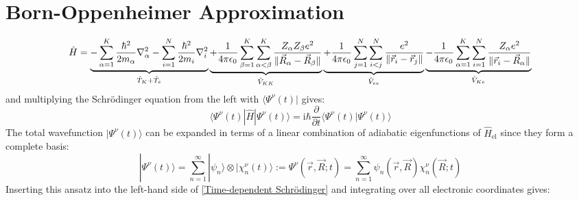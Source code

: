 \documentclass[9pt]{report}
\begin{document}
\section{Born-Oppenheimer Approximation}
\begin{equation}
\hat{H}=\underbrace{-\sum_{\alpha=1}^{K}\frac{\hbar^2}{2m_{\alpha}}\nabla_{\alpha}^2-\sum_{i=1}^{N}\frac{\hbar^2}{2m_{i}}\nabla_{i}^2}_{\hat{T}_K+\hat{T}_e}\underbrace{+\frac{1}{4\pi\epsilon_{0}}\sum_{\beta=1}^{K}\sum_{\alpha<\beta}^{K}\frac{Z_{\alpha}Z_{\beta}e^2}{\Vert\vec{R}_{\alpha}-\vec{R}_{\beta}\Vert}}_{\hat{V}_{KK}}\underbrace{+\frac{1}{4\pi\epsilon_{0}}\sum_{j=1}^{N}\sum_{i<j}^{N}\frac{e^2}{\Vert\vec{r}_{i}-\vec{r}_{j}\Vert}}_{\hat{V}_{ee}}\underbrace{-\frac{1}{4\pi\epsilon_{0}}\sum_{\alpha=1}^{K}\sum_{i=1}^{N}\frac{Z_{\alpha}e^2}{\Vert\vec{r}_{i}-\vec{R}_{\alpha}\Vert}}_{\hat{V}_{Ke}}\notag
\end{equation}
and multiplying the Schrödinger equation from the left with $\langle\Psi^{\nu}(t)|$ gives:
\begin{equation}
\langle\Psi^{\nu}(t)|\hat{H}|\Psi^{\nu}(t)\rangle = \mathrm{i}\hbar\frac{\partial}{\partial t}\langle\Psi^{\nu}(t)|\Psi^{\nu}(t)\rangle\label{Time-dependent Schrödinger}
\end{equation}
The total wavefunction $|\Psi^{\nu}(t)\rangle$ can be expanded in terms of a linear combination of adiabatic eigenfunctions of $\hat{H}_{\mathrm{el}}$ since they form a complete basis:
\begin{equation}
|\Psi^{\nu}(t)\rangle=\sum_{n=1}^{\infty}|\psi_{n}\rangle\otimes|\chi_{n}^{\nu}(t)\rangle:=\Psi^{\nu}(\vec{r},\vec{R};t)=\sum_{n=1}^{\infty}\psi_{n}(\vec{r},\vec{R})\chi_{n}^{\nu}(\vec{R};t)\label{Molecular Wavefunction}
\end{equation}
Inserting this ansatz into the left-hand side of \eqref{Time-dependent Schrödinger} and integrating over all electronic coordinates gives:
\allowdisplaybreaks
\footnotesize
\end{document}
